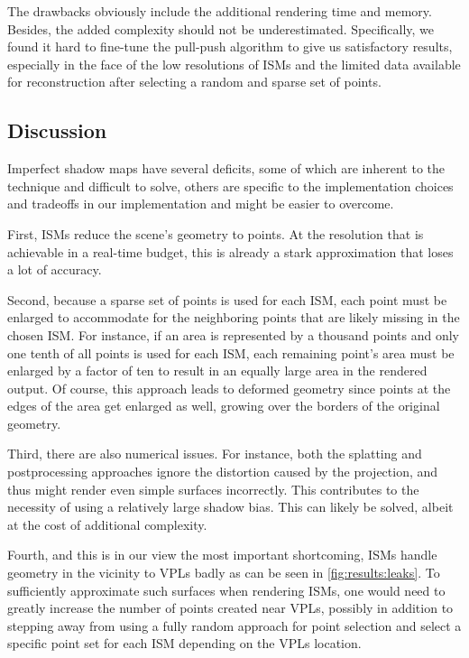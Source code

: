 The drawbacks obviously include the additional rendering time and memory. Besides, the added complexity should not be underestimated. Specifically, we found it hard to fine-tune the pull-push algorithm to give us satisfactory results, especially in the face of the low resolutions of ISMs and the limited data available for reconstruction after selecting a random and sparse set of points.




\subsection{Discussion}
\label{sec:results:ism:discussion}

Imperfect shadow maps have several deficits, some of which are inherent to the technique and difficult to solve, others are specific to the implementation choices and tradeoffs in our implementation and might be easier to overcome.

First, ISMs reduce the scene's geometry to points. At the resolution that is achievable in a real-time budget, this is already a stark approximation that loses a lot of accuracy.

Second, because a sparse set of points is used for each ISM, each point must be enlarged to accommodate for the neighboring points that are likely missing in the chosen ISM. For instance, if an area is represented by a thousand points and only one tenth of all points is used for each ISM, each remaining point's area must be enlarged by a factor of ten to result in an equally large area in the rendered output. Of course, this approach leads to deformed geometry since points at the edges of the area get enlarged as well, growing over the borders of the original geometry.

Third, there are also numerical issues. For instance, both the splatting and postprocessing approaches ignore the distortion caused by the projection, and thus might render even simple surfaces incorrectly. This contributes to the necessity of using a relatively large shadow bias. This can likely be solved, albeit at the cost of additional complexity.

Fourth, and this is in our view the most important shortcoming, ISMs handle geometry in the vicinity to VPLs badly as can be seen in \cref{fig:results:leaks}. To sufficiently approximate such surfaces when rendering ISMs, one would need to greatly increase the number of points created near VPLs, possibly in addition to stepping away from using a fully random approach for point selection and select a specific point set for each ISM depending on the VPLs location.

